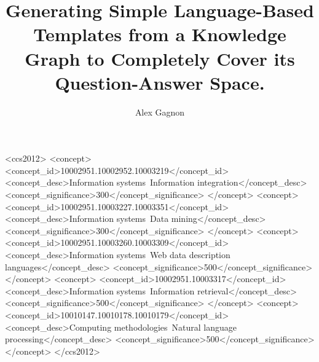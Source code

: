\documentclass[sigplan,screen]{acmart}
\begin{document}
\title{Generating Simple Language-Based Templates from a Knowledge Graph to Completely Cover its Question-Answer Space.}

\author{Alex Gagnon}

\renewcommand{\shortauthors}{Gagnon}

\begin{CCSXML}
  <ccs2012>
     <concept>
         <concept_id>10002951.10002952.10003219</concept_id>
         <concept_desc>Information systems~Information integration</concept_desc>
         <concept_significance>300</concept_significance>
         </concept>
     <concept>
         <concept_id>10002951.10003227.10003351</concept_id>
         <concept_desc>Information systems~Data mining</concept_desc>
         <concept_significance>300</concept_significance>
         </concept>
     <concept>
         <concept_id>10002951.10003260.10003309</concept_id>
         <concept_desc>Information systems~Web data description languages</concept_desc>
         <concept_significance>500</concept_significance>
         </concept>
     <concept>
         <concept_id>10002951.10003317</concept_id>
         <concept_desc>Information systems~Information retrieval</concept_desc>
         <concept_significance>500</concept_significance>
         </concept>
     <concept>
         <concept_id>10010147.10010178.10010179</concept_id>
         <concept_desc>Computing methodologies~Natural language processing</concept_desc>
         <concept_significance>500</concept_significance>
         </concept>
   </ccs2012>
\end{CCSXML}



\maketitle
\end{document}
